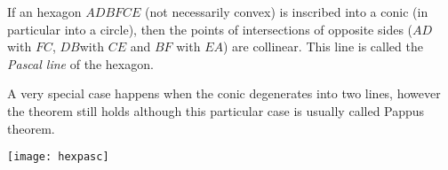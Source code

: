 \documentclass{article}
\begin{document}
If an hexagon $ADBFCE$ (not necessarily convex) is inscribed into a conic (in particular into a circle), then the points of intersections of opposite sides
($AD$ with $FC$, $DB$with $CE$ and $BF$ with $EA$) are collinear. This line is called the \emph{Pascal line} of the hexagon.

A very special case happens when the conic degenerates into two lines, however the theorem still holds although this particular case is usually called Pappus theorem.
\begin{center}
\texttt{[image: hexpasc]}
\end{center}
\end{document}

